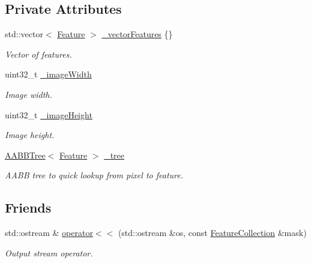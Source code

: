 \subsection*{Private Attributes}
\begin{DoxyCompactItemize}
\item 
std\+::vector$<$ \hyperlink{classfc_1_1Feature}{Feature} $>$ \hyperlink{classfc_1_1FeatureCollection_add1b0fdcaa47ee9ed4419ed201a33a10}{\+\_\+vector\+Features} \{\}
\begin{DoxyCompactList}\small\item\em Vector of features. \end{DoxyCompactList}\item 
uint32\+\_\+t \hyperlink{classfc_1_1FeatureCollection_abe7c56d374e649deeedf9cbf682d110c}{\+\_\+image\+Width}
\begin{DoxyCompactList}\small\item\em Image width. \end{DoxyCompactList}\item 
uint32\+\_\+t \hyperlink{classfc_1_1FeatureCollection_a2a4c8fce1036912295801e197dc15b3d}{\+\_\+image\+Height}
\begin{DoxyCompactList}\small\item\em Image height. \end{DoxyCompactList}\item 
\hyperlink{classfc_1_1AABBTree}{A\+A\+B\+B\+Tree}$<$ \hyperlink{classfc_1_1Feature}{Feature} $>$ \hyperlink{classfc_1_1FeatureCollection_aefe7fa7516a8968d16b299a38e082281}{\+\_\+tree}
\begin{DoxyCompactList}\small\item\em A\+A\+BB tree to quick lookup from pixel to feature. \end{DoxyCompactList}\end{DoxyCompactItemize}
\subsection*{Friends}
\begin{DoxyCompactItemize}
\item 
std\+::ostream \& \hyperlink{classfc_1_1FeatureCollection_aa9d00b19fc043e3122d92a976e07c54d}{operator$<$$<$} (std\+::ostream \&os, const \hyperlink{classfc_1_1FeatureCollection}{Feature\+Collection} \&mask)
\begin{DoxyCompactList}\small\item\em Output stream operator. \end{DoxyCompactList}\end{DoxyCompactItemize}


